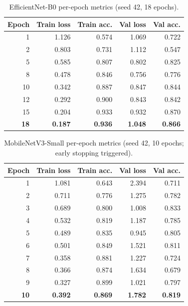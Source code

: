 \documentclass[conference,10pt]{IEEEtran}
\begin{document}
\begin{table}[!h]
\centering
\caption{EfficientNet-B0 per-epoch metrics (seed 42, 18 epochs).}
\label{tab:perepoch_eff}
\renewcommand{\arraystretch}{1.05}
\footnotesize
\begin{tabular}{rrrrr}
\toprule
\textbf{Epoch} & \textbf{Train loss} & \textbf{Train acc.} & \textbf{Val loss} & \textbf{Val acc.}\\
\midrule
1  & 1.126 & 0.574 & 1.069 & 0.722 \\
2  & 0.803 & 0.731 & 1.112 & 0.547 \\
5  & 0.585 & 0.807 & 0.802 & 0.825 \\
8  & 0.478 & 0.846 & 0.756 & 0.776 \\
10 & 0.342 & 0.887 & 0.847 & 0.844 \\
12 & 0.292 & 0.900 & 0.843 & 0.842 \\
15 & 0.204 & 0.933 & 0.932 & 0.870 \\
\textbf{18} & \textbf{0.187} & \textbf{0.936} & \textbf{1.048} & \textbf{0.866} \\
\bottomrule
\end{tabular}
\end{table}

\begin{table}[!h]
\centering
\caption{MobileNetV3-Small per-epoch metrics (seed 42, 10 epochs; early
stopping triggered).}
\label{tab:perepoch_mobile}
\renewcommand{\arraystretch}{1.05}
\footnotesize
\begin{tabular}{rrrrr}
\toprule
\textbf{Epoch} & \textbf{Train loss} & \textbf{Train acc.} & \textbf{Val loss} & \textbf{Val acc.}\\
\midrule
1  & 1.081 & 0.643 & 2.394 & 0.711 \\
2  & 0.711 & 0.776 & 1.275 & 0.782 \\
3  & 0.689 & 0.800 & 1.008 & 0.833 \\
4  & 0.532 & 0.819 & 1.187 & 0.785 \\
5  & 0.489 & 0.835 & 0.945 & 0.805 \\
6  & 0.501 & 0.849 & 1.521 & 0.811 \\
7  & 0.358 & 0.881 & 1.227 & 0.724 \\
8  & 0.366 & 0.874 & 1.634 & 0.679 \\
9  & 0.327 & 0.899 & 1.021 & 0.797 \\
\textbf{10} & \textbf{0.392} & \textbf{0.869} & \textbf{1.782} & \textbf{0.819} \\
\bottomrule
\end{tabular}
\end{table}
\end{document}
